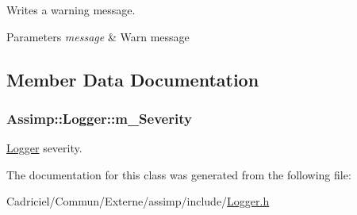 Writes a warning message. 


\begin{DoxyParams}{Parameters}
{\em message} & Warn message \\
\hline
\end{DoxyParams}


\subsection{Member Data Documentation}
\hypertarget{class_assimp_1_1_logger_ae1c96711eb927a5b33745a6211e93f56}{
\subsubsection[{m\-\_\-\-Severity}]{ Assimp\-::\-Logger\-::m\-\_\-\-Severity\hspace{0.3cm}{\ttfamily [protected]}}}\label{class_assimp_1_1_logger_ae1c96711eb927a5b33745a6211e93f56}


\hyperlink{class_assimp_1_1_logger}{Logger} severity. 



The documentation for this class was generated from the following file\-:\begin{DoxyCompactItemize}
\item 
Cadriciel/\-Commun/\-Externe/assimp/include/\hyperlink{_logger_8h}{Logger.\-h}\end{DoxyCompactItemize}
